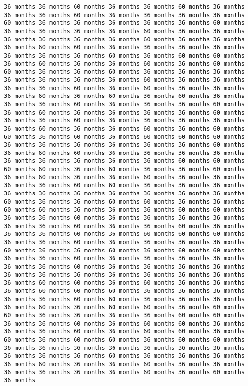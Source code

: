 \documentclass[11pt]{article}
\begin{document}
\begin{Verbatim}[commandchars=\\\{\}, frame=single, framerule=2mm, rulecolor=\color{outerrorbackground}]
36 months 36 months 60 months 36 months 36 months 60 months 36 months 36 months 36 months 60 months 36 months 36 months 36 months 36 months 60 months 36 months 36 months 36 months 36 months 36 months 60 months 36 months 36 months 36 months 36 months 60 months 36 months 36 months 36 months 36 months 36 months 36 months 60 months 36 months 36 months 36 months 60 months 60 months 36 months 36 months 36 months 36 months 36 months 36 months 36 months 60 months 36 months 60 months 60 months 36 months 60 months 36 months 36 months 60 months 36 months 60 months 60 months 36 months 36 months 60 months 36 months 36 months 36 months 36 months 36 months 36 months 36 months 60 months 36 months 36 months 36 months 36 months 60 months 36 months 60 months 36 months 36 months 36 months 60 months 36 months 60 months 36 months 60 months 36 months 36 months 36 months 60 months 36 months 36 months 36 months 60 months 36 months 60 months 36 months 36 months 36 months 36 months 60 months 36 months 36 months 60 months 36 months 36 months 36 months 36 months 36 months 60 months 36 months 36 months 60 months 36 months 60 months 60 months 36 months 60 months 36 months 60 months 60 months 60 months 36 months 36 months 36 months 36 months 36 months 36 months 60 months 36 months 60 months 60 months 36 months 36 months 36 months 36 months 36 months 36 months 36 months 36 months 36 months 60 months 60 months 60 months 60 months 36 months 60 months 36 months 36 months 60 months 36 months 60 months 36 months 36 months 60 months 36 months 36 months 36 months 36 months 60 months 60 months 36 months 36 months 36 months 36 months 36 months 36 months 36 months 36 months 36 months 36 months 60 months 36 months 36 months 60 months 60 months 36 months 36 months 60 months 60 months 36 months 36 months 36 months 60 months 60 months 36 months 36 months 60 months 36 months 36 months 36 months 36 months 36 months 36 months 60 months 36 months 36 months 60 months 36 months 36 months 36 months 60 months 36 months 60 months 60 months 60 months 36 months 36 months 60 months 36 months 36 months 36 months 36 months 60 months 36 months 36 months 60 months 36 months 60 months 60 months 36 months 36 months 60 months 36 months 36 months 36 months 36 months 36 months 36 months 60 months 36 months 36 months 36 months 36 months 36 months 36 months 36 months 36 months 36 months 36 months 36 months 36 months 60 months 60 months 36 months 60 months 36 months 36 months 36 months 60 months 60 months 60 months 36 months 36 months 36 months 36 months 36 months 60 months 60 months 36 months 36 months 36 months 36 months 60 months 36 months 60 months 60 months 36 months 60 months 60 months 36 months 36 months 36 months 36 months 60 months 60 months 36 months 36 months 60 months 36 months 60 months 60 months 36 months 36 months 36 months 60 months 36 months 60 months 60 months 36 months 60 months 36 months 60 months 60 months 36 months 60 months 60 months 36 months 36 months 36 months 36 months 36 months 36 months 36 months 36 months 36 months 36 months 60 months 36 months 36 months 36 months 36 months 60 months 36 months 36 months 60 months 36 months 36 months 36 months 36 months 36 months 36 months 60 months 36 months 60 months 36 months 
\end{Verbatim}
\end{document}
